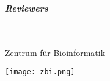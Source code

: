 \begin{titlepage}
\begin{minipage}{\textwidth}
\begin{center}
			\vspace{1cm}
			
			\textbf{\emph{Reviewers}}\\
			\supervisorIname \\
			\reviewerName \\
			
			\vspace{1.5cm}
			
			Zentrum f\"ur Bioinformatik\\
			
			\vspace{0.6cm}
			
			\texttt{[image: zbi.png]}			          

			\hfill
		\end{center}
	\end{minipage}
\end{titlepage}
